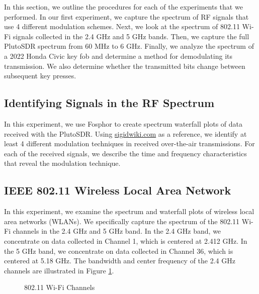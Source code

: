\documentclass{article}
\begin{document}
In this section, we outline the procedures for each of the experiments that we performed. In our first experiment, we capture the spectrum of RF signals that use 4 different modulation schemes. Next, we look at the spectrum of 802.11 Wi-Fi signals collected in the 2.4 GHz and 5 GHz bands. Then, we capture the full PlutoSDR spectrum from 60 MHz to 6 GHz. Finally, we analyze the spectrum of a 2022 Honda Civic key fob and determine a method for demodulating its transmission. We also determine whether the transmitted bits change between subsequent key presses.

\subsection{Identifying Signals in the RF Spectrum}

In this experiment, we use Fosphor to create spectrum waterfall plots of data received with the PlutoSDR. Using \url{sigidwiki.com} as a reference, we identify at least 4 different modulation techniques in received over-the-air transmissions. For each of the received signals, we describe the time and frequency characteristics that reveal the modulation technique.

\subsection{IEEE 802.11 Wireless Local Area Network}

In this experiment, we examine the spectrum and waterfall plots of wireless local area networks (WLANs). We specifically capture the spectrum of the 802.11 Wi-Fi channels in the 2.4 GHz and 5 GHz band. In the 2.4 GHz band, we concentrate on data collected in Channel 1, which is centered at 2.412 GHz. In the 5 GHz band, we concentrate on data collected in Channel 36, which is centered at 5.18 GHz. The bandwidth and center frequency of the 2.4 GHz channels are illustrated in Figure \ref{fig::802_11_channels}.

\begin{figure}[H]
	\centerline{}
	\caption{802.11 Wi-Fi Channels}
	\label{fig::802_11_channels}
\end{figure}
\end{document}
